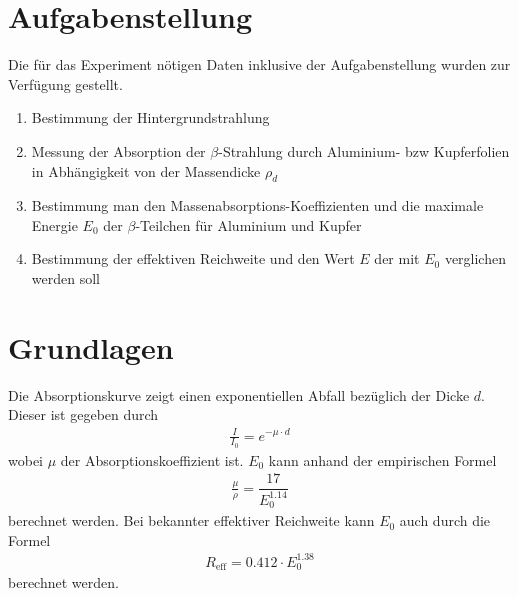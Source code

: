 \documentclass{article}
\begin{document}
\parindent0cm





\pagestyle{fancy}

\section{Aufgabenstellung}

Die für das Experiment nötigen Daten inklusive der Aufgabenstellung wurden zur Verfügung gestellt. 

\begin{enumerate}
\item Bestimmung der Hintergrundstrahlung
\item Messung der Absorption der $\beta$-Strahlung durch Aluminium- bzw Kupferfolien in Abhängigkeit von der Massendicke $\rho_d$
\item Bestimmung man den Massenabsorptions-Koeffizienten und die maximale Energie $E_0$ der $\beta$-Teilchen für Aluminium und Kupfer
\item Bestimmung der effektiven Reichweite und den Wert $E$ der mit $E_0$ verglichen werden soll
\end{enumerate}


\section{Grundlagen}

Die Absorptionskurve zeigt einen exponentiellen Abfall bezüglich der Dicke $d$. Dieser ist gegeben durch
\begin{align}
\frac{I}{I_0} = e^{-\mu\cdot d}
\label{eq:absorb}
\end{align}
wobei $\mu$ der Absorptionskoeffizient ist. $E_0$ kann anhand der empirischen Formel
\begin{align}
\frac{\mu}{\rho} = \dfrac{17}{E_0^{1.14}}
\label{eq:E0}
\end{align}
berechnet werden. Bei bekannter effektiver Reichweite kann $E_0$ auch durch die Formel
\begin{align}
R_\text{eff} = 0.412\cdot E_0^{1.38}
\label{eq:Reff}
\end{align}
berechnet werden.

\end{document}
